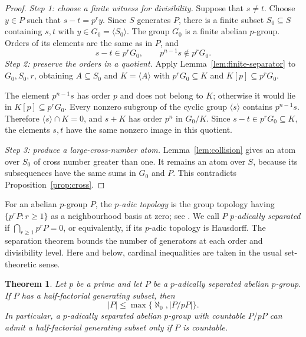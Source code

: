 \documentclass[11pt,reqno]{amsart}
\numberwithin{equation}{section}
\newtheorem{theorem}{Theorem}[section]
\theoremstyle{definition}
\theoremstyle{remark}
\begin{document}
\begin{proof}
\emph{Step 1: choose a finite witness for divisibility.}
Suppose that $s\ne t$. Choose $y\in P$ such
that $s-t=p^ry$. Since $S$ generates $P$, there is a finite
subset $S_0\subseteq S$ containing $s,t$ with
$y\in G_0=\langle S_0\rangle$. The group $G_0$ is a finite
abelian $p$-group. Orders of its elements are the same as in $P$,
and
\[
 s-t\in p^rG_0,\qquad p^{n-1}s\notin p^rG_0.
\]
\emph{Step 2: preserve the orders in a quotient.}
Apply Lemma~\ref{lem:finite-separator} to $G_0,S_0,r$, obtaining
$A\subseteq S_0$ and $K=\langle A\rangle$ with
$p^rG_0\subseteq K$ and $K[p]\subseteq p^rG_0$.

The element $p^{n-1}s$ has order $p$ and does not belong to $K$;
otherwise it would lie in $K[p]\subseteq p^rG_0$. Every nonzero
subgroup of the cyclic group $\langle s\rangle$ contains
$p^{n-1}s$. Therefore $\langle s\rangle\cap K=0$, and $s+K$
has order $p^n$ in $G_0/K$. Since $s-t\in p^rG_0\subseteq K$,
the elements $s,t$ have the same nonzero image in this quotient.

\emph{Step 3: produce a large-cross-number atom.}
Lemma~\ref{lem:collision} gives an atom over $S_0$ of cross number
greater than one. It remains an atom over $S$, because its
subsequences have the same sums in $G_0$ and $P$.
This contradicts Proposition~\ref{prop:cross}.
\end{proof}

For an abelian $p$-group $P$, the \emph{$p$-adic topology} is the
group topology having $\{p^rP:r\ge1\}$ as a neighbourhood basis
at zero; see \cite[Example~4.1(a)]{DikranjanGiordanoBruno}.
We call $P$ \emph{$p$-adically separated} if
$\bigcap_{r\ge1}p^rP=0$, or equivalently, if its $p$-adic
topology is Hausdorff. The separation theorem bounds the number of generators at each
order and divisibility level. Here and below, cardinal inequalities
are taken in the usual set-theoretic sense.

\begin{theorem}\label{thm:cardinality}
Let $p$ be a prime and let $P$ be a $p$-adically separated abelian
$p$-group. If $P$ has a half-factorial generating subset, then
\begin{equation}\label{eq:cardinality-bound}
 |P|\le\max\{\aleph_0,|P/pP|\}.
\end{equation}
In particular, a $p$-adically separated abelian $p$-group with
countable $P/pP$ can admit a half-factorial generating subset only
if $P$ is countable.
\end{theorem}
\end{document}

